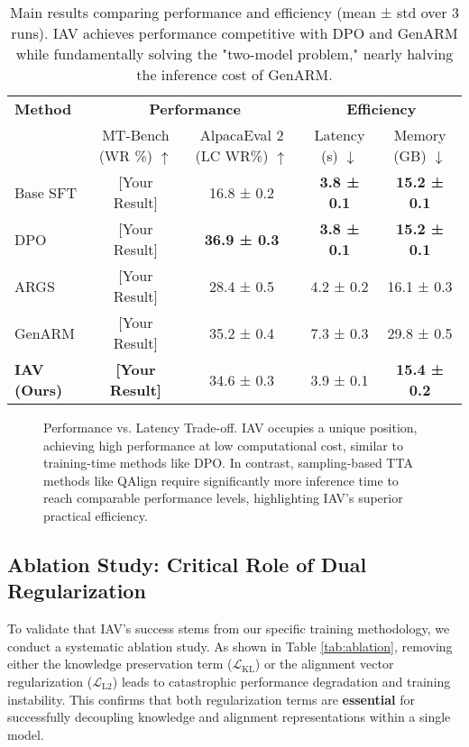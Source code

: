\documentclass{article} %
\begin{document}
\begin{table}[h!]
\centering
\caption{Main results comparing performance and efficiency (mean ± std over 3 runs). IAV achieves performance competitive with DPO and GenARM while fundamentally solving the "two-model problem," nearly halving the inference cost of GenARM.}
\label{tab:main_results}
\begin{tabular}{@{}l|cc|cc@{}}
\toprule
\textbf{Method} & \multicolumn{2}{c|}{\textbf{Performance}} & \multicolumn{2}{c}{\textbf{Efficiency}} \\
& MT-Bench (WR \%) $\uparrow$ & AlpacaEval 2 (LC WR\%) $\uparrow$ & Latency (s) $\downarrow$ & Memory (GB) $\downarrow$ \\
\midrule
Base SFT & [Your Result] & 16.8 ± 0.2 & \textbf{3.8 ± 0.1} & \textbf{15.2 ± 0.1} \\
DPO & [Your Result] & \textbf{36.9 ± 0.3} & \textbf{3.8 ± 0.1} & \textbf{15.2 ± 0.1} \\
\midrule
ARGS & [Your Result] & 28.4 ± 0.5 & 4.2 ± 0.2 & 16.1 ± 0.3 \\
GenARM & [Your Result] & 35.2 ± 0.4 & 7.3 ± 0.3 & 29.8 ± 0.5 \\
\textbf{IAV (Ours)} & \textbf{[Your Result]} & 34.6 ± 0.3 & 3.9 ± 0.1 & \textbf{15.4 ± 0.2} \\
\bottomrule
\end{tabular}
\end{table}


\begin{figure}[h!]
    \centering
    \vspace{2cm} 
    \caption{Performance vs. Latency Trade-off. IAV occupies a unique position, achieving high performance at low computational cost, similar to training-time methods like DPO. In contrast, sampling-based TTA methods like QAlign require significantly more inference time to reach comparable performance levels, highlighting IAV's superior practical efficiency.}
    \label{fig:perf_latency_tradeoff}
\end{figure}

\subsection{Ablation Study: Critical Role of Dual Regularization}
To validate that IAV's success stems from our specific training methodology, we conduct a systematic ablation study. As shown in Table \ref{tab:ablation}, removing either the knowledge preservation term ($\mathcal{L}_{\text{KL}}$) or the alignment vector regularization ($\mathcal{L}_{\text{L2}}$) leads to catastrophic performance degradation and training instability. This confirms that both regularization terms are \textbf{essential} for successfully decoupling knowledge and alignment representations within a single model.
\end{document}
